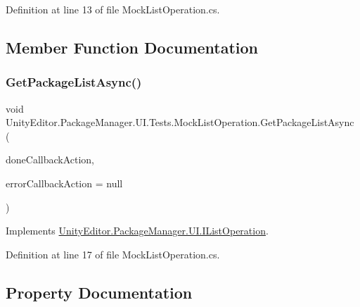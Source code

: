 Definition at line 13 of file Mock\+List\+Operation.\+cs.



\subsection{Member Function Documentation}
\mbox{\label{class_unity_editor_1_1_package_manager_1_1_u_i_1_1_tests_1_1_mock_list_operation_aae7372d4b96be2e32932308ccf3b250b}} 
\subsubsection{\texorpdfstring{GetPackageListAsync()}{GetPackageListAsync()}}
{\footnotesize\ttfamily void Unity\+Editor.\+Package\+Manager.\+U\+I.\+Tests.\+Mock\+List\+Operation.\+Get\+Package\+List\+Async (\begin{DoxyParamCaption}\item[{Action$<$ I\+Enumerable$<$ \mbox{\hyperlink{class_unity_editor_1_1_package_manager_1_1_u_i_1_1_package_info}{Package\+Info}} $>$$>$}]{done\+Callback\+Action,  }\item[{Action$<$ Error $>$}]{error\+Callback\+Action = {\ttfamily null} }\end{DoxyParamCaption})}



Implements \mbox{\hyperlink{interface_unity_editor_1_1_package_manager_1_1_u_i_1_1_i_list_operation_af9786e05457b17b3cc3a5fdc4a5b42ae}{Unity\+Editor.\+Package\+Manager.\+U\+I.\+I\+List\+Operation}}.



Definition at line 17 of file Mock\+List\+Operation.\+cs.



\subsection{Property Documentation}
\mbox{\label{class_unity_editor_1_1_package_manager_1_1_u_i_1_1_tests_1_1_mock_list_operation_ab36529b4c9c193f5f9d11a80bd780327}} 
